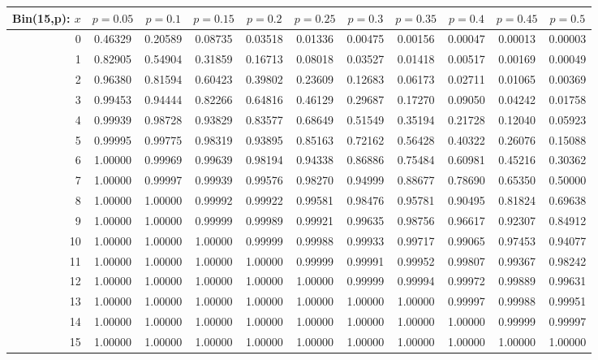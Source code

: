 \documentclass{article}
\begin{document}
{\vspace{8pt minus 6pt}
\begin{tabular}{@{\extracolsep{-2pt}}|r|c|c|c|c|c|c|c|c|c|c|}
\hline
Bin(15,p): $x$
   & $p\!=\!0.05$& $p\!=\!0.1$& $p\!=\!0.15$& $p\!=\!0.2$& $p\!=\!0.25$& $p\!=\!0.3$& $p\!=\!0.35$& $p\!=\!0.4$& $p\!=\!0.45$& $p\!=\!0.5$\\\hline
  0&0.46329&0.20589&0.08735&0.03518&0.01336&0.00475&0.00156&0.00047&0.00013&0.00003\\
  1&0.82905&0.54904&0.31859&0.16713&0.08018&0.03527&0.01418&0.00517&0.00169&0.00049\\
  2&0.96380&0.81594&0.60423&0.39802&0.23609&0.12683&0.06173&0.02711&0.01065&0.00369\\
  3&0.99453&0.94444&0.82266&0.64816&0.46129&0.29687&0.17270&0.09050&0.04242&0.01758\\
  4&0.99939&0.98728&0.93829&0.83577&0.68649&0.51549&0.35194&0.21728&0.12040&0.05923\\
  5&0.99995&0.99775&0.98319&0.93895&0.85163&0.72162&0.56428&0.40322&0.26076&0.15088\\
  6&1.00000&0.99969&0.99639&0.98194&0.94338&0.86886&0.75484&0.60981&0.45216&0.30362\\
  7&1.00000&0.99997&0.99939&0.99576&0.98270&0.94999&0.88677&0.78690&0.65350&0.50000\\
  8&1.00000&1.00000&0.99992&0.99922&0.99581&0.98476&0.95781&0.90495&0.81824&0.69638\\
  9&1.00000&1.00000&0.99999&0.99989&0.99921&0.99635&0.98756&0.96617&0.92307&0.84912\\
 10&1.00000&1.00000&1.00000&0.99999&0.99988&0.99933&0.99717&0.99065&0.97453&0.94077\\
 11&1.00000&1.00000&1.00000&1.00000&0.99999&0.99991&0.99952&0.99807&0.99367&0.98242\\
 12&1.00000&1.00000&1.00000&1.00000&1.00000&0.99999&0.99994&0.99972&0.99889&0.99631\\
 13&1.00000&1.00000&1.00000&1.00000&1.00000&1.00000&1.00000&0.99997&0.99988&0.99951\\
 14&1.00000&1.00000&1.00000&1.00000&1.00000&1.00000&1.00000&1.00000&0.99999&0.99997\\
 15&1.00000&1.00000&1.00000&1.00000&1.00000&1.00000&1.00000&1.00000&1.00000&1.00000\\
\hline
\end{tabular}

}
\end{document}
